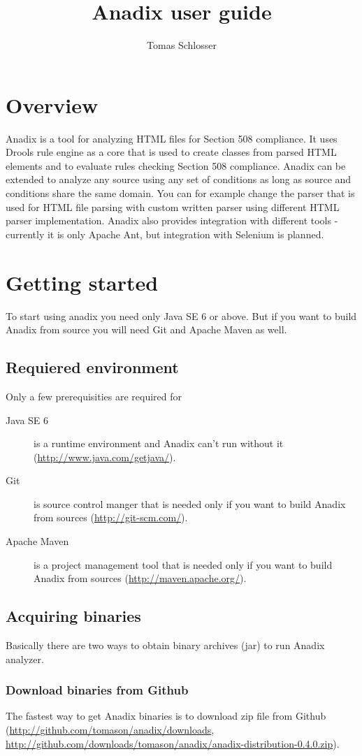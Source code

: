 \documentclass{report}
\title{Anadix user guide}
\author{Tomas Schlosser}
\begin{document}
\maketitle
\tableofcontents

\chapter{Overview}
Anadix is a tool for analyzing HTML files for Section 508 compliance. It uses
Drools rule engine as a core that is used to create classes from parsed HTML
elements and to evaluate rules checking Section 508 compliance. Anadix can be
extended to analyze any source using any set of conditions as long as source and
conditions share the same domain. You can for example change the parser that is
used for HTML file parsing with custom written parser using different HTML
parser implementation. Anadix also provides integration with different tools -
currently it is only Apache Ant, but integration with Selenium is planned.

\chapter{Getting started}
To start using anadix you need only Java SE 6 or above. But if you want to build
Anadix from source you will need Git and Apache Maven as well. 
\section{Requiered environment}
Only a few prerequisities are required for 
\begin{description}
  \item[Java SE 6] is a runtime environment and Anadix can't run without it 
  (\url{http://www.java.com/getjava/}).
  \item[Git] is source control manger that is needed only if you want to build
  Anadix from sources (\url{http://git-scm.com/}).
  \item[Apache Maven] is a project management tool that is needed only if you
  want to build Anadix from sources (\url{http://maven.apache.org/}).
\end{description}

\section{Acquiring binaries}
Basically there are two ways to obtain binary archives (jar) to run Anadix
analyzer.
\subsection{Download binaries from Github}
The fastest way to get Anadix binaries is to download zip file from Github
(\url{http://github.com/tomason/anadix/downloads}, 
\url{http://github.com/downloads/tomason/anadix/anadix-distribution-0.4.0.zip}).
\end{document}
